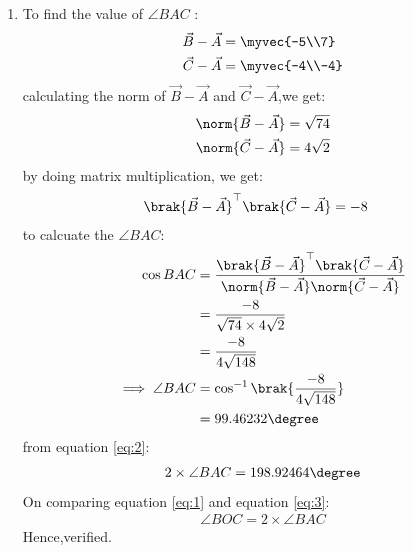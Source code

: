 \documentclass[journal,12pt,twocolumn]{IEEEtran}
\theoremstyle{remark}
\begin{document}
\begin{enumerate}
	\item To find  the value of $\angle{BAC}$ :
\begin{align}
\vec{B}-\vec{A}&=\myvec{-5\\7}\\
\vec{C}-\vec{A}&=\myvec{-4\\-4}
\end{align}
calculating the norm of $\vec{B}-\vec{A}$ and $\vec{C}-\vec{A}$,we get:
\begin{align}
	\norm{\vec{B}-\vec{A}}&= \sqrt{74}\\
	\norm{\vec{C}-\vec{A}}&= 4\sqrt{2}
\end{align}
by doing matrix multiplication, we get:
\begin{align}
\brak{\vec{B}-\vec{A}}^{\top}\brak{\vec{C}-\vec{A}}&=-8
\end{align}
to calcuate the $\angle{BAC}$:
\begin{align}
\cos{BAC}&=\frac{\brak{\vec{B}-\vec{A}}^{\top}\brak{\vec{C}-\vec{A}}}{\norm{\vec{B}-\vec{A}}\norm{\vec{C}-\vec{A}}}\\
&=\frac{-8}{\sqrt{74}\times4\sqrt{2}}\\
&=\frac{-8}{4\sqrt{148}}\\
\implies\angle{BAC}&=\cos^{-1}\brak{\frac{-8}{4\sqrt{148}}}\\
&=99.46232\degree \label{eq:2}
\end{align}
from equation \eqref{eq:2}:
\begin{align}
2\times\angle{BAC}=198.92464\degree \label{eq:3}
\end{align}
On comparing equation \eqref{eq:1} and equation \eqref{eq:3}:
\begin{align}
\angle{BOC}=2\times\angle{BAC}
\end{align}
Hence,verified.

\end{enumerate}
\end{document}
